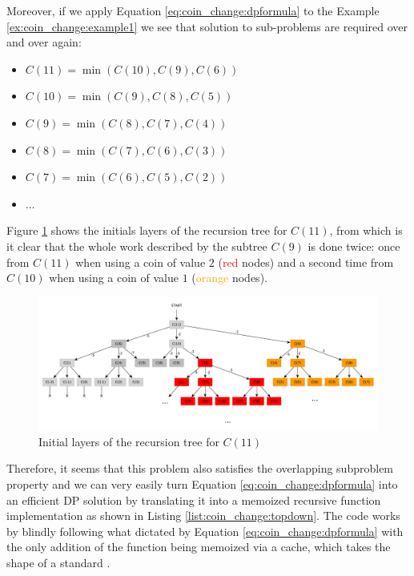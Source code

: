 Moreover, if we apply Equation \ref{eq:coin_change:dpformula} to the Example \ref{ex:coin_change:example1} we see that solution to sub-problems are required over and over again:
\begin{itemize}
	\item $C(11) = \min(C(10),C(9), C(6))$
	\item $C(10) = \min(C(9),C(8), C(5))$
	\item $C(9) = \min(C(8),C(7), C(4))$
	\item $C(8) = \min(C(7),C(6), C(3))$
	\item $C(7) = \min(C(6),C(5), C(2))$
	\item $\ldots$
\end{itemize}
Figure \ref{fig:coin_change:DPtree} shows the initials layers of the recursion tree for $C(11)$, from which is it clear that the whole work described by the subtree $C(9)$ is done twice: once from  $C(11)$ when using a coin of value $2$ (\textcolor{red}{red} nodes) and a second time from $C(10)$ when using a coin of value $1$ (\textcolor{orange}{orange} nodes).

\begin{figure}
	\centering
	\includegraphics[width=\textwidth]{sources/coin_change/images/DPtree}
	\caption{Initial layers of the recursion tree for $C(11)$}
	\label{fig:coin_change:DPtree}
\end{figure}

Therefore, it seems that this problem also satisfies the overlapping subproblem property and we can very easily turn Equation \ref{eq:coin_change:dpformula} into an efficient DP solution by translating it into a memoized recursive function implementation as shown in Listing \ref{list:coin_change:topdown}.
The code works by blindly following what dictated by Equation \ref{eq:coin_change:dpformula} with the only addition of the function  being memoized via a cache, which takes the shape of a standard .

